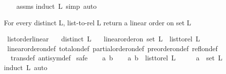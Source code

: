 \begin{isabellebody}
\ \ %
\endisadelimproof
%
\isatagproof
{}\isamarkupfalse%
\ assms\isanewline
{}\isamarkupfalse%
{\isacharparenleft}{\kern0pt}induct\ L{\isacharcomma}{\kern0pt}\ simp{\isacharcomma}{\kern0pt}\ auto{\isacharparenright}{\kern0pt}\ \isamarkupfalse%
%
\endisatagproof
{\isafoldproof}%
%
\isadelimproof
%
\endisadelimproof
%
\begin{isamarkuptext}%
For every distinct L, list-to-rel L return a linear order on set L%
\end{isamarkuptext}\isamarkuptrue%
\isamarkupfalse%
\ list{\isacharunderscore}{\kern0pt}order{\isacharunderscore}{\kern0pt}linear{\isacharcolon}{\kern0pt}\isanewline
\ \ \ {\isachardoublequoteopen}distinct\ L{\isachardoublequoteclose}\isanewline
\ \ \ {\isachardoublequoteopen}linear{\isacharunderscore}{\kern0pt}order{\isacharunderscore}{\kern0pt}on\ {\isacharparenleft}{\kern0pt}set\ L{\isacharparenright}{\kern0pt}\ \ {\isacharparenleft}{\kern0pt}list{\isacharunderscore}{\kern0pt}to{\isacharunderscore}{\kern0pt}rel\ L{\isacharparenright}{\kern0pt}{\isachardoublequoteclose}\ \isanewline
%
\isadelimproof
\ \ %
\endisadelimproof
%
\isatagproof
{}\isamarkupfalse%
\ linear{\isacharunderscore}{\kern0pt}order{\isacharunderscore}{\kern0pt}on{\isacharunderscore}{\kern0pt}def\ total{\isacharunderscore}{\kern0pt}on{\isacharunderscore}{\kern0pt}def\ partial{\isacharunderscore}{\kern0pt}order{\isacharunderscore}{\kern0pt}on{\isacharunderscore}{\kern0pt}def\ preorder{\isacharunderscore}{\kern0pt}on{\isacharunderscore}{\kern0pt}def\ refl{\isacharunderscore}{\kern0pt}on{\isacharunderscore}{\kern0pt}def\isanewline
\ \ trans{\isacharunderscore}{\kern0pt}def\ antisym{\isacharunderscore}{\kern0pt}def\ \isanewline
{}\isamarkupfalse%
{\isacharparenleft}{\kern0pt}safe{\isacharparenright}{\kern0pt}\isanewline
\ \ \isamarkupfalse%
\ a\ b\isanewline
\ \ \isamarkupfalse%
\ {\isachardoublequoteopen}{\isacharparenleft}{\kern0pt}a{\isacharcomma}{\kern0pt}\ b{\isacharparenright}{\kern0pt}\ {\isasymin}\ list{\isacharunderscore}{\kern0pt}to{\isacharunderscore}{\kern0pt}rel\ L{\isachardoublequoteclose}\isanewline
\ \ \isamarkupfalse%
\ \isamarkupfalse%
\ {\isachardoublequoteopen}a\ {\isasymin}\ set\ L{\isachardoublequoteclose}\ \isanewline
\ \ \isamarkupfalse%
{\isacharparenleft}{\kern0pt}induct\ L{\isacharcomma}{\kern0pt}\ auto{\isacharparenright}{\kern0pt}\ \isamarkupfalse%

\end{isabellebody}

